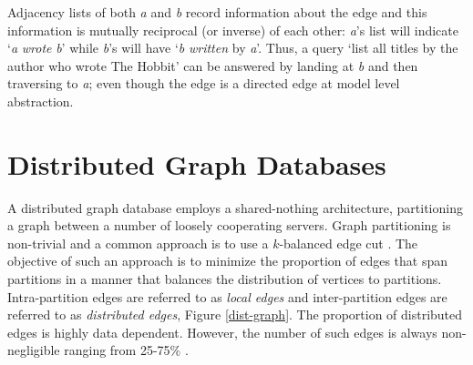 \documentclass[sigplan,10pt]{acmart}
\begin{document}
Adjacency lists of both \emph{a} and \emph{b} record information about the edge and this information is mutually reciprocal (or inverse) of each other: \emph{a}'s list will indicate `\emph{a} \emph{wrote} \emph{b}' while \emph{b}'s will have `\emph{b} \emph{written} by \emph{a}'. Thus, a query `list all titles by the author who wrote The Hobbit' can be answered by landing at \emph{b} and then traversing to \emph{a}; even though the edge is a directed edge at model level abstraction.

\section{Distributed Graph Databases}

A distributed graph database employs a shared-nothing architecture, partitioning a graph between a number of loosely cooperating servers. Graph partitioning is non-trivial and a common approach is to use a $k$-balanced edge cut \cite{Huang2016}. The objective of such an approach is to minimize the proportion of edges that span partitions in a manner that balances the distribution of vertices to partitions. Intra-partition edges are referred to as \textit{local edges} and inter-partition edges are referred to as \textit{distributed edges}, Figure \ref{dist-graph}. The proportion of distributed edges is highly data dependent. However, the number of such edges is always non-negligible ranging from 25-75\% \cite{Huang2016}.
\end{document}
